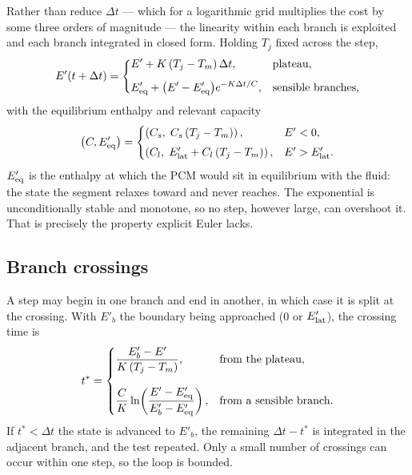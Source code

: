 Rather than reduce $\Delta t$ --- which for a logarithmic grid multiplies the
cost by some three orders of magnitude --- the linearity within each branch is
exploited and each branch integrated in closed form. Holding $T_{j}$ fixed
across the step,
\begin{equation}
  E'(t+\Delta t) =
  \begin{dcases}
    E' + K\left(T_{j}-T_{m}\right)\Delta t,
      & \text{plateau,}\\[4pt]
    E'_{\mathrm{eq}} + \bigl(E'-E'_{\mathrm{eq}}\bigr)e^{-K\Delta t/C},
      & \text{sensible branches,}
  \end{dcases}
  \label{eq:exact}
\end{equation}
with the equilibrium enthalpy and relevant capacity
\begin{equation}
  \left(C,E'_{\mathrm{eq}}\right) =
  \begin{cases}
    \left(C_{s},\;C_{s}\left(T_{j}-T_{m}\right)\right), & E'<0,\\[3pt]
    \left(C_{l},\;E'_{\mathrm{lat}}+C_{l}\left(T_{j}-T_{m}\right)\right), & E'>E'_{\mathrm{lat}}.
  \end{cases}
  \label{eq:Eeq}
\end{equation}
$E'_{\mathrm{eq}}$ is the enthalpy at which the PCM would sit in equilibrium with the fluid:
the state the segment relaxes toward and never reaches. The exponential is
unconditionally stable and monotone, so no step, however large, can overshoot
it. That is precisely the property explicit Euler lacks.

\subsection{Branch crossings}

A step may begin in one branch and end in another, in which case it is split at
the crossing. With $E'_{b}$ the boundary being approached ($0$ or $E'_{\mathrm{lat}}$), the
crossing time is
\begin{equation}
  t^{*} =
  \begin{dcases}
    \frac{E'_{b}-E'}{K\left(T_{j}-T_{m}\right)}, & \text{from the plateau},\\[8pt]
    \frac{C}{K}\ln\!\left(\frac{E'-E'_{\mathrm{eq}}}{E'_{b}-E'_{\mathrm{eq}}}\right),
      & \text{from a sensible branch}.
  \end{dcases}
  \label{eq:crossing}
\end{equation}
If $t^{*}<\Delta t$ the state is advanced to $E'_{b}$, the remaining
$\Delta t-t^{*}$ is integrated in the adjacent branch, and the test repeated.
Only a small number of crossings can occur within one step, so the loop is
bounded.


